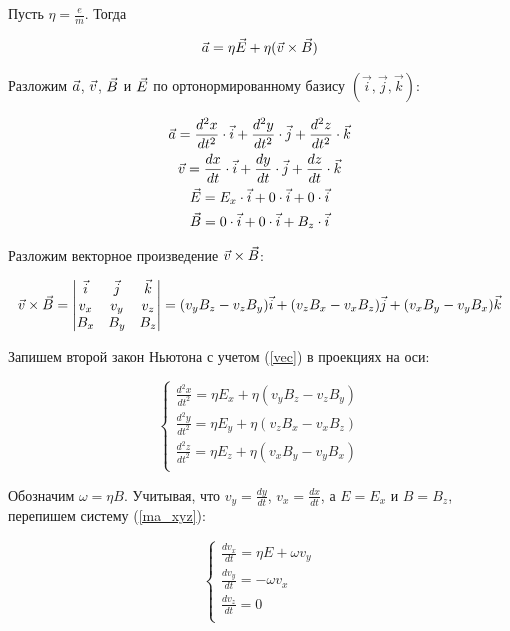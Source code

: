 Пусть $\eta=\frac{e}{m}$. Тогда

\begin{gather}
	\vec{a}=\eta\vec{E}+\eta(\vec{v}\times\vec{B})
\end{gather}

Разложим $\vec{a}$, $\vec{v}$, $\vec{B}$ и $\vec{E}$ по ортонормированному базису $(\vec{i},\vec{j},\vec{k})$:

\begin{gather}
	\vec{a}=\frac{d^2x}{dt^2}\cdot\vec{i}+\frac{d^2y}{dt^2}\cdot\vec{j}+\frac{d^2z}{dt^2}\cdot\vec{k}\\
	\vec{v}=\frac{dx}{dt}\cdot\vec{i}+\frac{dy}{dt}\cdot\vec{j}+\frac{dz}{dt}\cdot\vec{k}\\
	\vec{E}=E_x\cdot\vec{i}+0\cdot\vec{i}+0\cdot\vec{i}\\
	\vec{B}=0\cdot\vec{i}+0\cdot\vec{i}+B_z\cdot\vec{i}
\end{gather}

Разложим векторное произведение $\vec{v}\times\vec{B}$:

\begin{gather}
	\label{vec}
	\vec{v}\times\vec{B} = \begin{vmatrix} \vec{i} & \vec{j} & \vec{k} \\ v_x & v_y & v_z \\ B_x & B_y & B_z \end{vmatrix}=(v_yB_z-v_zB_y)\vec{i}+(v_zB_x-v_xB_z)\vec{j}+(v_xB_y-v_yB_x)\vec{k}
\end{gather}

Запишем второй закон Ньютона с учетом (\ref{vec}) в проекциях на оси:

\begin{equation}
\label{ma_xyz}
 \begin{cases}
   \frac{d^2x}{dt^2}=\eta{}E_x+\eta(v_yB_z-v_zB_y)\\
   \frac{d^2y}{dt^2}=\eta{}E_y+\eta(v_zB_x-v_xB_z)\\
   \frac{d^2z}{dt^2}=\eta{}E_z+\eta(v_xB_y-v_yB_x)\\
 \end{cases}
\end{equation}

Обозначим $\omega=\eta{B}$. Учитывая, что $v_y=\frac{dy}{dt}$, $v_x=\frac{dx}{dt}$,  а $E=E_x$ и $B=B_z$, перепишем систему (\ref{ma_xyz}):

\begin{equation}
\label{dv}
 \begin{cases}
   \frac{dv_x}{dt}=\eta{}E+\omega{}v_y\\
   \frac{dv_y}{dt}=-\omega{}v_x\\
   \frac{dv_z}{dt}=0\\
 \end{cases}
\end{equation}

